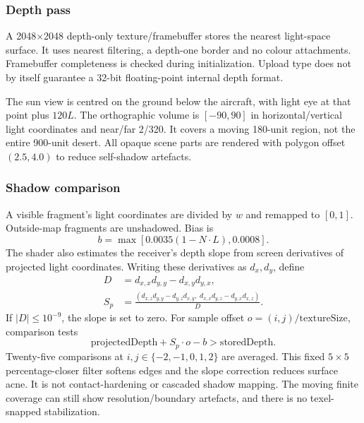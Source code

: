 \subsubsection{Depth pass}
A 2048$\times$2048 depth-only texture/framebuffer stores the nearest light-space surface. It uses nearest filtering, a depth-one border and no colour attachments. Framebuffer completeness is checked during initialization. Upload type  does not by itself guarantee a 32-bit floating-point internal depth format.

The sun view is centred on the ground below the aircraft, with light eye at that point plus $120L$. The orthographic volume is $[-90,90]$ in horizontal/vertical light coordinates and near/far 2/320. It covers a moving 180-unit region, not the entire 900-unit desert. All opaque scene parts are rendered with polygon offset $(2.5,4.0)$ to reduce self-shadow artefacts.

\subsubsection{Shadow comparison}
A visible fragment's light coordinates are divided by $w$ and remapped to $[0,1]$. Outside-map fragments are unshadowed. Bias is
\begin{equation}
b=\max[0.0035(1-N\cdot L),0.0008].
\end{equation}
The shader also estimates the receiver's depth slope from screen derivatives of projected light coordinates. Writing these derivatives as $d_x,d_y$, define
\begin{align}
D&=d_{x,x}d_{y,y}-d_{x,y}d_{y,x},\\
S_p&=\frac{(d_{x,z}d_{y,y}-d_{y,z}d_{x,y},\;d_{x,x}d_{y,z}-d_{y,x}d_{x,z})}{D}.
\end{align}
If $|D|\le10^{-9}$, the slope is set to zero. For sample offset $o=(i,j)/\mathrm{textureSize}$, comparison tests
\begin{equation}
\mathrm{projectedDepth}+S_p\cdot o-b>\mathrm{storedDepth}.
\end{equation}
Twenty-five comparisons at $i,j\in\{-2,-1,0,1,2\}$ are averaged. This fixed $5\times5$ percentage-closer filter softens edges and the slope correction reduces surface acne. It is not contact-hardening or cascaded shadow mapping. The moving finite coverage can still show resolution/boundary artefacts, and there is no texel-snapped stabilization.


